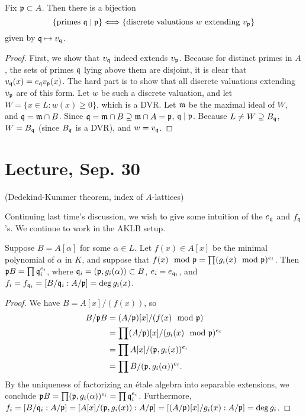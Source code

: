 \documentclass[11pt]{amsart}
\begin{document}
\begin{prop}
Fix $\mathfrak{p}\subset A$. Then there is a bijection
\[\{\mathrm{primes\ } \mathfrak{q}\mid \mathfrak{p}\} \Longleftrightarrow \{\mathrm{discrete\ valuations\ } w \mathrm{\ extending\ } v_{\mathfrak{p}}\}\]
given by $\mathfrak{q} \mapsto v_{\mathfrak{q}}$.
\end{prop}

\begin{proof}
First, we show that $v_{\mathfrak{q}}$ indeed extends $v_{\mathfrak{p}}$. Because for distinct primes in $A$, the sets of primes $\mathfrak{q}$ lying above them are disjoint, it is clear that $v_{\mathfrak{q}}(x) = e_{\mathfrak{q}}v_{\mathfrak{p}}(x)$. The hard part is to show that all discrete valuations extending $v_{\mathfrak{p}}$ are of this form. Let $w$ be such a discrete valuation, and let $W = \{x\in L: w(x) \ge 0\}$, which is a DVR. Let $\mathfrak{m}$ be the maximal ideal of $W$, and $\mathfrak{q} = \mathfrak{m} \cap B$. Since $\mathfrak{q} = \mathfrak{m} \cap B \supseteq \mathfrak{m} \cap A = \mathfrak{p}$, $\mathfrak{q}\mid \mathfrak{p}$. Because $L\neq W \supseteq B_{\mathfrak{q}}$, $W = B_{\mathfrak{q}}$ (since $B_{\mathfrak{q}}$ is a DVR), and $w = v_{\mathfrak{q}}$.
\end{proof}


\section{Lecture, Sep. 30}

(Dedekind-Kummer theorem, index of $A$-lattices)

Continuing last time's discussion, we wish to give some intuition of the $e_{\mathfrak{q}}$ and $f_{\mathfrak{q}}$'s. We continue to work in the AKLB setup.

\begin{thm}
Suppose $B = A[\alpha]$ for some $\alpha\in L$. Let $f(x)\in A[x]$ be the minimal polynomial of $\alpha$ in $K$, and suppose that $f(x) \mod {\mathfrak{p}} = \prod (g_i(x) \mod {\mathfrak{p}})^{e_i}$. Then $\mathfrak{p} B = \prod \mathfrak{q}_i^{e_i}$, where $\mathfrak{q}_i = (\mathfrak{p}, g_i(\alpha)) \subset B$, $e_i = e_{\mathfrak{q}_i}$, and $f_i = f_{\mathfrak{q}_i} = [B/\mathfrak{q}_i :A/\mathfrak{p}] = \deg g_i(x)$.
\end{thm}

\begin{proof}
We have $B = A[x]/(f(x))$, so 
\begin{align*}
    B/\mathfrak{p} B &= (A/\mathfrak{p})[x]/(f(x)\mod{\mathfrak{p}}) \\
    &= \prod (A/\mathfrak{p})[x]/(g_i(x)\mod{\mathfrak{p}})^{e_i} \\
    &= \prod A[x]/(\mathfrak{p}, g_i(x))^{e_i} \\
    &= \prod B/(\mathfrak{p}, g_i(\alpha))^{e_i}.
\end{align*}
By the uniqueness of factorizing an \'etale algebra into separable extensions, we conclude $\mathfrak{p} B = \prod (\mathfrak{p}, g_i(\alpha))^{e_i} = \prod \mathfrak{q}_i^{e_i}$. Furthermore, $f_i = [B/\mathfrak{q}_i: A/\mathfrak{p}] = [A[x]/(\mathfrak{p}, g_i(x)): A/\mathfrak{p}] = [(A/\mathfrak{p})[x]/g_i(x) : A/\mathfrak{p}] = \deg g_i$.
\end{proof}
\end{document}
